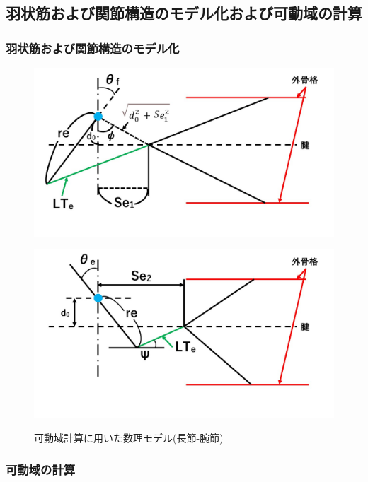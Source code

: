 \subsection{羽状筋および関節構造のモデル化および可動域の計算}
\subsubsection{羽状筋および関節構造のモデル化}
\begin{figure}[ht]
  \begin{minipage}{0.49\hsize}
    \centering  
    \includegraphics[scale=0.23]{image/model_1.jpg}
    \label{fig:model_1_before}
  \end{minipage}
  \begin{minipage}{0.49\hsize}
    \centering
    \includegraphics[scale=0.23]{image/model_2.jpg}
    \label{fig:model_1_after}
  \end{minipage}
  \caption{可動域計算に用いた数理モデル(長節-腕節)}
  \label{fig:model_1}
\end{figure}
%
\subsubsection{可動域の計算}







